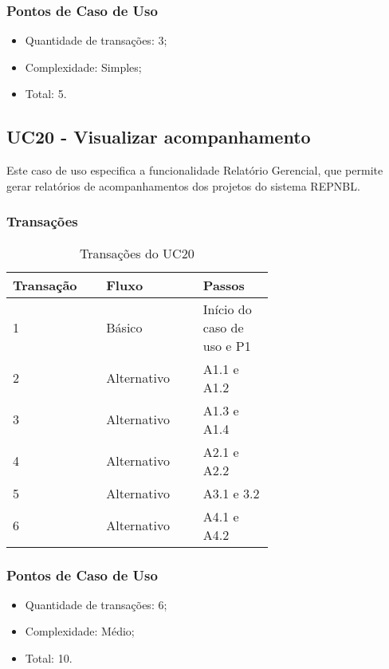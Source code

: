   \subsubsection{Pontos de Caso de Uso}

  \begin{itemize}
  \item Quantidade de transações: 3;
  \item Complexidade: Simples;
  \item Total: 5.
  \end{itemize}
   
\subsection{UC20 - Visualizar acompanhamento}
  
  Este caso de uso especifica a funcionalidade Relatório Gerencial, que permite gerar 
  relatórios de acompanhamentos dos projetos do sistema REPNBL.
  
  \subsubsection{Transações}

  \begin{table*}[!h]
  \centering
  \caption{Transações do UC20}
  \label{uc20_transactions}
    \begin{tabular}{|p{0.20\linewidth}|p{0.25\linewidth}|p{0.20\linewidth}|}
    \hline
    \textbf{Transação} & \textbf{Fluxo} & \textbf{Passos} \\ 
    \hline
    1 & Básico & Início do caso de uso e P1\\
    \hline
    2 & Alternativo & A1.1 e A1.2 \\
    \hline
    3 & Alternativo & A1.3 e A1.4 \\
    \hline
    4 & Alternativo & A2.1 e A2.2\\
    \hline
    5 & Alternativo & A3.1 e 3.2\\
    \hline
    6 & Alternativo & A4.1 e A4.2\\
    \hline
    \end{tabular}
  \end{table*}

  \subsubsection{Pontos de Caso de Uso}

  \begin{itemize}
  \item Quantidade de transações: 6;
  \item Complexidade: Médio;
  \item Total: 10.
  \end{itemize}

